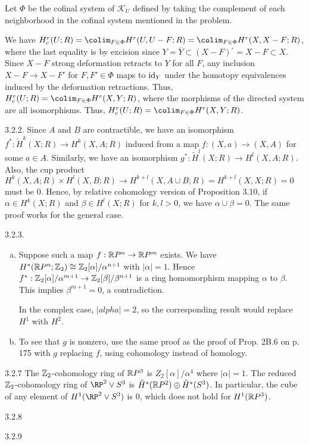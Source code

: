 \documentclass{article}
\begin{document}
 Let $\Phi$ be the cofinal system of $\mathcal{K}_U$ defined by taking the complement of each neighborhood in the cofinal system mentioned in the problem. 
 
We have $H^r_c(U; R) = \colim_{F \in \Phi} H^r(U, U - F; R) = \colim_{F \in \Phi} H^r(X, X - F; R)$, where the last equality is by excision since $Y = \overline Y \subset (X - F)^\circ = X - F \subset X$. Since $X - F$ strong deformation retracts to $Y$ for all $F$, any inclusion $X - F \to X - F'$ for $F, F' \in \Phi$  maps to $\operatorname{id}_Y$ under the homotopy equivalences induced by the deformation retractions. Thus, $H^r_c(U; R) = \colim_{F \in \Phi} H^r(X, Y; R)$, where the morphisms of the directed system are all isomorphisms.  Thus, $H^r_c(U; R) = \colim_{F \in \Phi} H^r(X, Y; R)$.

 3.2.2. Since $A$ and $B$ are contractible, we have an isomorphism $f^*: \tilde H^k(X;R) \to H^k(X, A;R)$ induced from a map $f:(X,a) \to (X,A)$ for some $a \in A$. Similarly, we have an isomorphism $g^*: \tilde H^l(X;R) \to H^l(X,A;R)$. Also, the cup product 
$H^k(X,A;R) \times H^l(X,B;R) \to H^{k+l}(X, A \cup B; R) = H^{k+l}(X, X; R) = 0$ must be 0.  Hence, by relative cohomology version of Proposition 3.10, if $\alpha \in H^k(X;R)$ and $\beta \in H^l(X;R)$ for $k, l > 0$, we have $\alpha \cup \beta = 0$. The same proof works for the general case.

 3.2.3. 
\begin{enumerate}[(a)]
\item Suppose such a map $f: \mathbb{R} P^n \to \mathbb{R} P^m$ exists. We have $H^*(\mathbb{R} P^n;\mathbb{Z}_2) \cong \mathbb{Z}_2[\alpha]/\alpha^{n+1}$ with $|\alpha| = 1$. Hence $f^*:\mathbb{Z}_2[\alpha]/\alpha^{m+1} \to \mathbb{Z}_2[\beta]/\beta^{n+1}$ is a ring homomorphism mapping $\alpha$ to $\beta$. This implies $\beta^{m+1} = 0$, a contradiction.

In the complex case, $|alpha| = 2$, so the corresponding result would replace $H^1$ with $H^2$.

\item To see that $g$ is nonzero, use the same proof as the proof of Prop. 2B.6 on p. 175 with $g$ replacing $f$, using cohomology instead of homology.
\end{enumerate}

 3.2.7 The $\mathbb{Z}_2$-cohomology ring of $\mathbb{R} P^3$ is $Z_2[\alpha]/\alpha^4$ where $|\alpha| = 1$. The reduced $\mathbb{Z}_2$-cohomology ring of $\RP^2 \vee S^3$ is
$\tilde H^*(\mathbb{R} P^2) \oplus \tilde H^*(S^3)$. In particular, the cube of any element of $H^1(\RP^2 \vee S^3)$ is $0$, which does not hold for $H^1(\mathbb{R} P^3)$.

 3.2.8

 3.2.9
\end{document}
